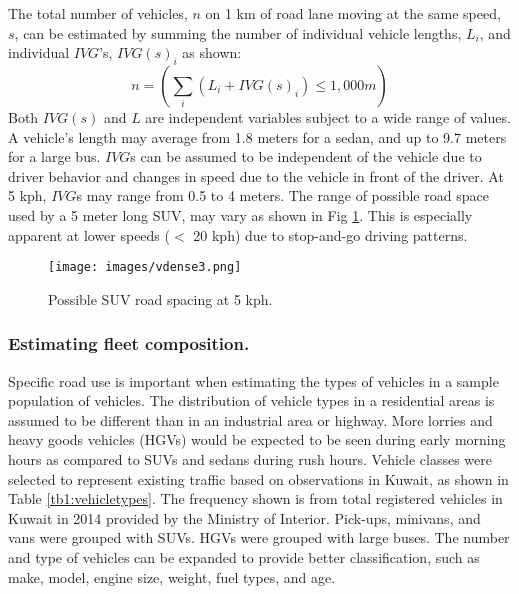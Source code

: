 \documentclass[preprint,12pt,a4paper,authoryear]{elsarticle}
\begin{document}
\begin{linenumbers}
The total number of vehicles, $n$ on 1 km of road lane moving at the same speed, $s$, can be estimated by summing the number of individual vehicle lengths, $L_{i}$, and individual $IVG$'s, $IVG(s)_{i}$ as shown:
% 
\begin{equation}
\label{eq1:roadspace}
n =  \left ( \sum_{i}\left ({L_{i} + IVG(s)_{i}} \right )\leq 1,000m   \right ) 
\end{equation}
%
Both $IVG(s)$ and $L$ are independent variables subject to a wide range of values.  A vehicle’s length may average from 1.8 meters for a sedan, and up to 9.7 meters for a large bus.  $IVG$s can be assumed to be independent of the vehicle due to driver behavior and changes in speed due to the vehicle in front of the driver.  At 5 kph, $IVG$s may range from 0.5 to 4 meters.  The range of possible road space used by a 5 meter long SUV, may vary as shown in Fig \ref{fig3:SUVspace}.  This is especially apparent at lower speeds ($<$ 20 kph) due to stop-and-go driving patterns.  

%
\begin{figure}[H]
\texttt{[image: images/vdense3.png]} 
\caption{Possible SUV road spacing at 5 kph.}
\label{fig3:SUVspace}
\end{figure}
%
\subsubsection{Estimating fleet composition.}
Specific road use is important when estimating the types of vehicles in a sample population of vehicles.  The distribution of vehicle types in a residential areas is assumed to be different than in an industrial area or highway. More lorries and heavy goods vehicles (HGVs) would be expected to be seen during early morning hours as compared to SUVs and sedans during rush hours. Vehicle classes were selected to represent existing traffic based on observations in Kuwait, as shown in Table \ref{tb1:vehicletypes}. The frequency shown is from total registered vehicles in Kuwait in 2014 provided by the Ministry of Interior. Pick-ups, minivans, and vans were grouped with SUVs. HGVs were grouped with large buses. The number and type of vehicles can be expanded to provide better classification, such as make, model, engine size, weight, fuel types, and age.


\end{linenumbers}
\end{document}
